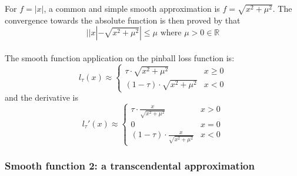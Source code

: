 For $f = |x|$, a common and simple smooth approximation is $
    f = \sqrt{x^2 + \mu^2}
$.
 The convergence towards the absolute function is then proved by \citeauthor{voroninConvolutionBasedSmooth2015a}\cite{voroninConvolutionBasedSmooth2015a} that 
\begin{equation}
    ||x| - \sqrt{x^2 + \mu^2}| \leq \mu \text{  where } \mu > 0 \in \mathbb{R}
\end{equation}
\\
The smooth function application on the pinball loss function is:
\begin{equation}
    l_\tau(x) \approx 
    \begin{cases}
        \tau \cdot \sqrt{x^2 + \mu^2} & {x \geq 0} \\
        (1-\tau) \cdot \sqrt{x^2 + \mu^2} & {x < 0}
    \end{cases}
\end{equation}
and the derivative is
\begin{equation}
    l_\tau\prime(x) \approx 
    \begin{cases}
        \tau \cdot \frac{x}{\sqrt{x^2 + \mu^2}} & {x > 0} \\
        0 & {x=0} \\
        (1-\tau) \cdot \frac{x}{\sqrt{x^2 + \mu^2}} & {x<0}
    \end{cases}
\end{equation}
\subsubsection{Smooth function 2: a transcendental approximation}
\label{subsec: smooth_new}

